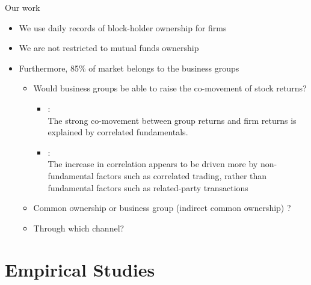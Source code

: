 \documentclass[handout]{beamer}
\begin{document}
	\begin{frame}{Our work}
		\begin{itemize}
			\item 
			We use daily records of block-holder ownership for firms
			\item We are not restricted to mutual funds ownership
			\item Furthermore, 85\% of market belongs to the business groups
			\begin{itemize}
				\item Would business groups be able to raise the co-movement of stock returns?
				\begin{itemize}
					\tiny
					\item \cite{cho2015stock}: \\
					The strong co-movement between group returns and
					firm returns is explained by correlated fundamentals. 
					\item \cite{kim2015stock}:\\
					The increase in correlation appears to be driven
					more by non-fundamental factors such as correlated trading, rather
					than fundamental factors such as related-party transactions
				\end{itemize}
			\item Common ownership or business group (indirect common ownership) ?
			\item  Through which channel?
			\end{itemize}
			
		\end{itemize}
	\end{frame}
	
	\normalsize

	
	
	\section{Empirical Studies}
\end{document}
